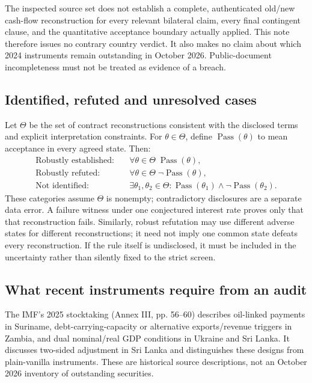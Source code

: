 \documentclass[11pt,a4paper]{article}
\begin{document}
The inspected source set does not establish a complete, authenticated old/new cash-flow reconstruction for every relevant bilateral claim, every final contingent clause, and the quantitative acceptance boundary actually applied. This note therefore issues no contrary country verdict. It also makes no claim about which 2024 instruments remain outstanding in October 2026. Public-document incompleteness must not be treated as evidence of a breach.

\subsection{Identified, refuted and unresolved cases}
Let $\Theta$ be the set of contract reconstructions consistent with the disclosed terms and explicit interpretation constraints. For $\theta\in\Theta$, define $\operatorname{Pass}(\theta)$ to mean acceptance in every agreed state. Then:
\begin{align*}
 \text{Robustly established:}&\quad \forall\theta\in\Theta\;\operatorname{Pass}(\theta),\\
 \text{Robustly refuted:}&\quad \forall\theta\in\Theta\;\neg\operatorname{Pass}(\theta),\\
 \text{Not identified:}&\quad \exists\theta_1,\theta_2\in\Theta:
   \operatorname{Pass}(\theta_1)\wedge\neg\operatorname{Pass}(\theta_2).
\end{align*}
These categories assume $\Theta$ is nonempty; contradictory disclosures are a separate data error. A failure witness under one conjectured interest rate proves only that that reconstruction fails. Similarly, robust refutation may use different adverse states for different reconstructions; it need not imply one common state defeats every reconstruction. If the rule itself is undisclosed, it must be included in the uncertainty rather than silently fixed to the strict screen.

\subsection{What recent instruments require from an audit}
The IMF's 2025 stocktaking (Annex III, pp. 56--60) describes oil-linked payments in Suriname, debt-carrying-capacity or alternative exports/revenue triggers in Zambia, and dual nominal/real GDP conditions in Ukraine and Sri Lanka. It discusses two-sided adjustment in Sri Lanka and distinguishes these designs from plain-vanilla instruments. These are historical source descriptions, not an October 2026 inventory of outstanding securities.
\end{document}
